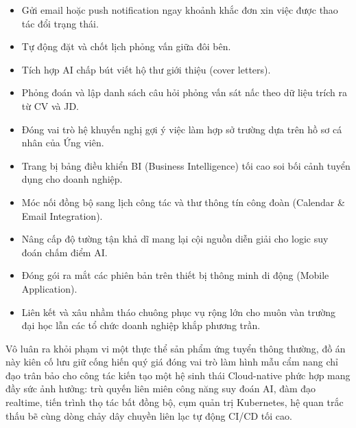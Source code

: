 \begin{itemize}
\tightlist
\item
  Gửi email hoặc push notification ngay khoảnh khắc đơn xin việc được
  thao tác đổi trạng thái.
\item
  Tự động đặt và chốt lịch phỏng vấn giữa đôi bên.
\item
  Tích hợp AI chấp bút viết hộ thư giới thiệu (cover letters).
\item
  Phỏng đoán và lập danh sách câu hỏi phỏng vấn sát nấc theo dữ liệu
  trích ra từ CV và JD.
\item
  Đóng vai trò hệ khuyến nghị gợi ý việc làm hợp sở trường dựa trên hồ
  sơ cá nhân của Ứng viên.
\item
  Trang bị bảng điều khiển BI (Business Intelligence) tối cao soi bối
  cảnh tuyển dụng cho doanh nghiệp.
\item
  Móc nối đồng bộ sang lịch công tác và thư thông tín công đoàn
  (Calendar \& Email Integration).
\item
  Nâng cấp độ tường tận khả dĩ mang lại cội nguồn diễn giải cho logic
  suy đoán chấm điểm AI.
\item
  Đóng gói ra mắt các phiên bản trên thiết bị thông minh di động (Mobile
  Application).
\item
  Liên kết và xâu nhầm tháo chuông phục vụ rộng lớn cho muôn vàn trường
  đại học lẫn các tổ chức doanh nghiệp khắp phương trần.
\end{itemize}

Vô luân ra khỏi phạm vi một thực thể sản phẩm ứng tuyển thông thường, đồ
án này kiên cố lưu giữ cống hiến quý giá đóng vai trò làm hình mẫu cẩm
nang chỉ đạo trân bảo cho công tác kiến tạo một hệ sinh thái
Cloud-native phức hợp mang đầy sức ảnh hưởng: trù quyến liên miên công
năng suy đoán AI, đàm đạo realtime, tiến trình thọ tác bất đồng bộ, cụm
quản trị Kubernetes, hệ quan trắc thấu bẽ cùng dòng chảy dây chuyền liên
lạc tự động CI/CD tối cao.
